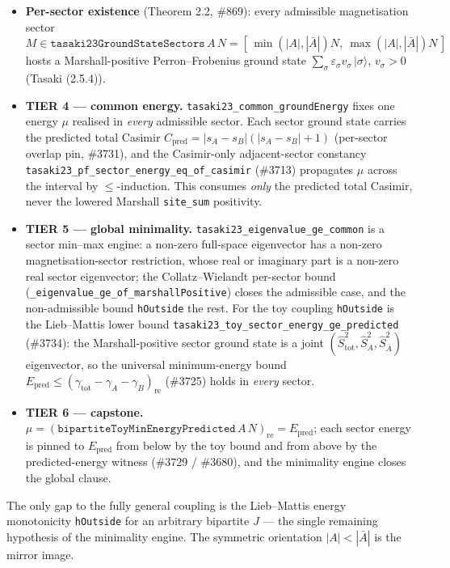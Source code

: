 \documentclass[a4paper,11pt]{article}
\begin{document}
\begin{itemize}
\item \textbf{Per-sector existence} (Theorem 2.2, \#869): every
admissible magnetisation sector
\(M\in\texttt{tasaki23GroundStateSectors}\,A\,N
  =[\,\min(|A|,|\bar A|)N,\ \max(|A|,|\bar A|)N\,]\)
hosts a Marshall-positive Perron--Frobenius ground state
\(\sum_\sigma \varepsilon_\sigma v_\sigma\,|\sigma\rangle\),
\(v_\sigma>0\) (Tasaki (2.5.4)).

\item \textbf{TIER 4 --- common energy.}
\texttt{tasaki23\_common\_groundEnergy} fixes one energy
\(\mu\) realised in \emph{every} admissible sector.  Each sector ground
state carries the predicted total Casimir
\(C_{\mathrm{pred}}=|s_A-s_B|(|s_A-s_B|+1)\)
(per-sector overlap pin, \#3731), and the Casimir-only adjacent-sector
constancy \texttt{tasaki23\_pf\_sector\_energy\_eq\_of\_casimir} (\#3713)
propagates \(\mu\) across the interval by \(\le\)-induction.  This
consumes \emph{only} the predicted total Casimir, never the lowered
Marshall \texttt{site\_sum} positivity.

\item \textbf{TIER 5 --- global minimality.}
\texttt{tasaki23\_eigenvalue\_ge\_common} is a sector min--max engine: a
non-zero full-space eigenvector has a non-zero magnetisation-sector
restriction, whose real or imaginary part is a non-zero real sector
eigenvector; the Collatz--Wielandt per-sector bound
(\texttt{\_eigenvalue\_ge\_of\_marshallPositive}) closes the admissible
case, and the non-admissible bound \texttt{hOutside} the rest.  For the
toy coupling \texttt{hOutside} is the Lieb--Mattis lower bound
\texttt{tasaki23\_toy\_sector\_energy\_ge\_predicted} (\#3734): the
Marshall-positive sector ground state is a joint
\((\hat S^2_{\mathrm{tot}},\hat S^2_A,\hat S^2_{\bar A})\) eigenvector, so
the universal minimum-energy bound
\(E_{\mathrm{pred}}\le(\gamma_{\mathrm{tot}}-\gamma_A-\gamma_B)_{\mathrm{re}}\)
(\#3725) holds in \emph{every} sector.

\item \textbf{TIER 6 --- capstone.}
\(\mu=(\texttt{bipartiteToyMinEnergyPredicted}\,A\,N)_{\mathrm{re}}
   =E_{\mathrm{pred}}\); each sector energy is pinned to \(E_{\mathrm{pred}}\)
from below by the toy bound and from above by the predicted-energy
witness (\#3729 / \#3680), and the minimality engine closes the global
clause.
\end{itemize}

The only gap to the fully general coupling is the Lieb--Mattis energy
monotonicity \texttt{hOutside} for an arbitrary bipartite \(J\) --- the
single remaining hypothesis of the minimality engine.  The symmetric
orientation \(|A|<|\bar A|\) is the mirror image.
\end{document}

